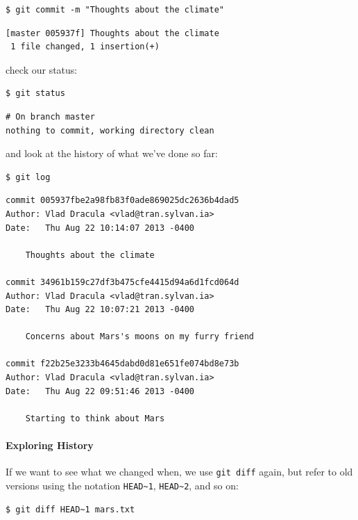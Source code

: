 \documentclass{book}
\begin{document}
\begin{verbatim}
$ git commit -m "Thoughts about the climate"
\end{verbatim}

\begin{verbatim}
[master 005937f] Thoughts about the climate
 1 file changed, 1 insertion(+)
\end{verbatim}

check our status:

\begin{verbatim}
$ git status
\end{verbatim}

\begin{verbatim}
# On branch master
nothing to commit, working directory clean
\end{verbatim}

and look at the history of what we've done so far:

\begin{verbatim}
$ git log
\end{verbatim}

\begin{verbatim}
commit 005937fbe2a98fb83f0ade869025dc2636b4dad5
Author: Vlad Dracula <vlad@tran.sylvan.ia>
Date:   Thu Aug 22 10:14:07 2013 -0400

    Thoughts about the climate

commit 34961b159c27df3b475cfe4415d94a6d1fcd064d
Author: Vlad Dracula <vlad@tran.sylvan.ia>
Date:   Thu Aug 22 10:07:21 2013 -0400

    Concerns about Mars's moons on my furry friend

commit f22b25e3233b4645dabd0d81e651fe074bd8e73b
Author: Vlad Dracula <vlad@tran.sylvan.ia>
Date:   Thu Aug 22 09:51:46 2013 -0400

    Starting to think about Mars
\end{verbatim}

\mbox{}\paragraph{Exploring History}

If we want to see what we changed when, we use \texttt{git diff} again,
but refer to old versions using the notation
\texttt{HEAD\textasciitilde{}1}, \texttt{HEAD\textasciitilde{}2}, and so
on:

\begin{verbatim}
$ git diff HEAD~1 mars.txt
\end{verbatim}
\end{document}
